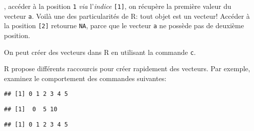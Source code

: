 \noindent, accéder à la position \texttt{1} \emph{via} l'\emph{indice} \texttt{[1]}, on récupère la première valeur du vecteur \texttt{a}.
Voilà une des particularités de R: tout objet est un vecteur!
Accéder à la position \texttt{[2]} retourne \texttt{NA}, parce que le vecteur \texttt{a} ne possède pas de deuxième position.

On peut créer des vecteurs dans R en utilisant la commande \texttt{c}.

\begin{knitrout}
\color{fgcolor}\begin{kframe}
\begin{flushleft}
\ttfamily\noindent
{}\hlassignement{\usebox{\hlnormalsizeboxlessthan}-}{\ }\hlkeyword{(}\hlkeyword{,}{\ }\hlkeyword{,}{\ }\hlkeyword{,}{\ }\hlkeyword{,}{\ }\hlkeyword{)}\mbox{}
\normalfont
\end{flushleft}
\end{kframe}
\end{knitrout}


R propose différents raccourcis pour créer rapidement des vecteurs.
Par exemple, examinez le comportement des commandes suivantes:

\begin{knitrout}
\color{fgcolor}\begin{kframe}
\begin{flushleft}
\ttfamily\noindent
{}\hlkeyword{(}\hlargument{=}{\ }\hlkeyword{,}{\ }\hlargument{=}{\ }\hlkeyword{,}{\ }\hlargument{=}{\ }\hlkeyword{)}\mbox{}
\normalfont
\end{flushleft}
\begin{verbatim}
## [1] 0 1 2 3 4 5
\end{verbatim}
\begin{flushleft}
\ttfamily\noindent
{}\hlkeyword{(}\hlargument{=}{\ }\hlkeyword{,}{\ }\hlargument{=}{\ }\hlkeyword{,}{\ }\hlargument{=}{\ }\hlkeyword{)}\mbox{}
\normalfont
\end{flushleft}
\begin{verbatim}
## [1]  0  5 10
\end{verbatim}
\begin{flushleft}
\ttfamily\noindent
{}\hlkeyword{(}\hlkeyword{:}\hlkeyword{)}\mbox{}
\normalfont
\end{flushleft}
\begin{verbatim}
## [1] 0 1 2 3 4 5
\end{verbatim}
\end{kframe}
\end{knitrout}


